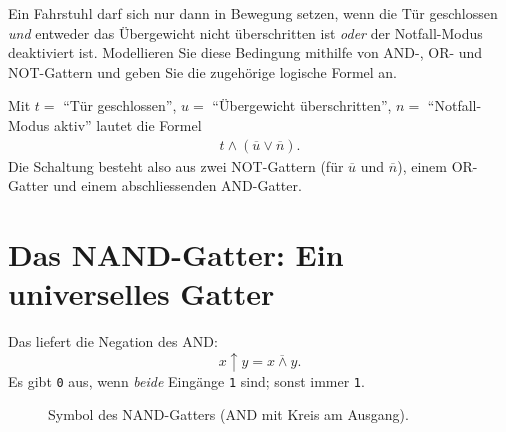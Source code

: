 \begin{myexercise}\label{myexercise:gatter-anwendung}
    Ein Fahrstuhl darf sich nur dann in Bewegung setzen, wenn die Tür geschlossen \emph{und} entweder das Übergewicht nicht überschritten ist \emph{oder} der Notfall-Modus deaktiviert ist. Modellieren Sie diese Bedingung mithilfe von AND-, OR- und NOT-Gattern und geben Sie die zugehörige logische Formel an.
    \begin{myanswer}
        Mit $t=$ \enquote{Tür geschlossen}, $u=$ \enquote{Übergewicht überschritten}, $n=$ \enquote{Notfall-Modus aktiv} lautet die Formel
        \begin{align*}
            t \wedge (\overline{u} \vee \overline{n}).
        \end{align*}
        Die Schaltung besteht also aus zwei NOT-Gattern (für $\overline{u}$ und $\overline{n}$), einem OR-Gatter und einem abschliessenden AND-Gatter.
    \end{myanswer}
\end{myexercise}

\section{Das NAND-Gatter: Ein universelles Gatter}\label{sec:nand}

\begin{mydefinition}
    Das  liefert die Negation des AND:
    \[
        x \uparrow y = \overline{x \wedge y}.
    \]
    Es gibt \texttt{0} aus, wenn \emph{beide} Eingänge \texttt{1} sind; sonst immer \texttt{1}.
\end{mydefinition}

\begin{figure}[H]
    \centering
    \caption{Symbol des NAND-Gatters (AND mit Kreis am Ausgang).}
    \label{fig:nand_gatter}
\end{figure}

